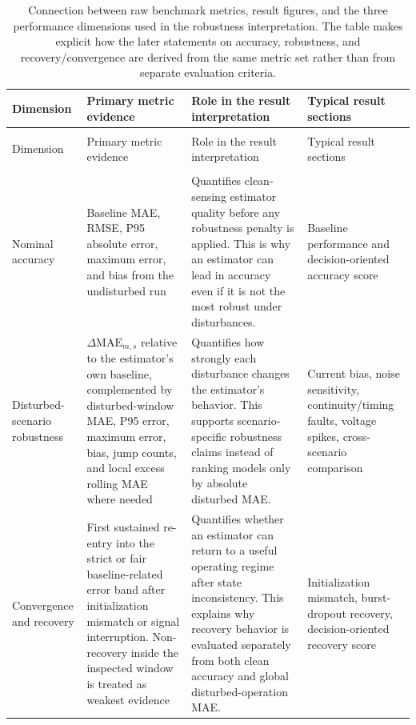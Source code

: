 \documentclass[
    a4paper,
    12pt,
    titlepage,
    bibliography=totoc,
    twoside=on,
    parskip=false,
    numbers=noenddot,
    cleardoublepage=empty,
    DIV=12,
    BCOR=12.0mm,
    headheight=36pt,
    headings=openright
]{scrreprt}
\begin{document}
\begingroup
\small
\begin{longtable}{@{}>{\raggedright\arraybackslash}p{2.2cm}>{\raggedright\arraybackslash}p{3.8cm}>{\raggedright\arraybackslash}p{4.7cm}>{\raggedright\arraybackslash}p{3.1cm}@{}}
\caption[Connection between raw metrics and result dimensions.]{Connection between raw benchmark metrics, result figures, and the three performance dimensions used in the robustness interpretation. The table makes explicit how the later statements on accuracy, robustness, and recovery/convergence are derived from the same metric set rather than from separate evaluation criteria.}
\label{tab:robustness_metric_dimensions}\\
\toprule
Dimension & Primary metric evidence & Role in the result interpretation & Typical result sections \\
\midrule
\endfirsthead
\multicolumn{4}{@{}l}{\small\textit{Table~\thetable\ continued from the previous page}}\\
\toprule
Dimension & Primary metric evidence & Role in the result interpretation & Typical result sections \\
\midrule
\endhead
\midrule
\multicolumn{4}{r@{}}{\small\textit{Continued on the next page}}\\
\endfoot
\bottomrule
\endlastfoot
Nominal accuracy & Baseline MAE, RMSE, P95 absolute error, maximum error, and bias from the undisturbed run & Quantifies clean-sensing estimator quality before any robustness penalty is applied. This is why an estimator can lead in accuracy even if it is not the most robust under disturbances. & Baseline performance and decision-oriented accuracy score \\
Disturbed-scenario robustness & $\Delta\mathrm{MAE}_{m,s}$ relative to the estimator's own baseline, complemented by disturbed-window MAE, P95 error, maximum error, bias, jump counts, and local excess rolling MAE where needed & Quantifies how strongly each disturbance changes the estimator's behavior. This supports scenario-specific robustness claims instead of ranking models only by absolute disturbed MAE. & Current bias, noise sensitivity, continuity/timing faults, voltage spikes, cross-scenario comparison \\
Convergence and recovery & First sustained re-entry into the strict or fair baseline-related error band after initialization mismatch or signal interruption. Non-recovery inside the inspected window is treated as weakest evidence & Quantifies whether an estimator can return to a useful operating regime after state inconsistency. This explains why recovery behavior is evaluated separately from both clean accuracy and global disturbed-operation MAE. & Initialization mismatch, burst-dropout recovery, decision-oriented recovery score \\
\end{longtable}
\endgroup
\end{document}

